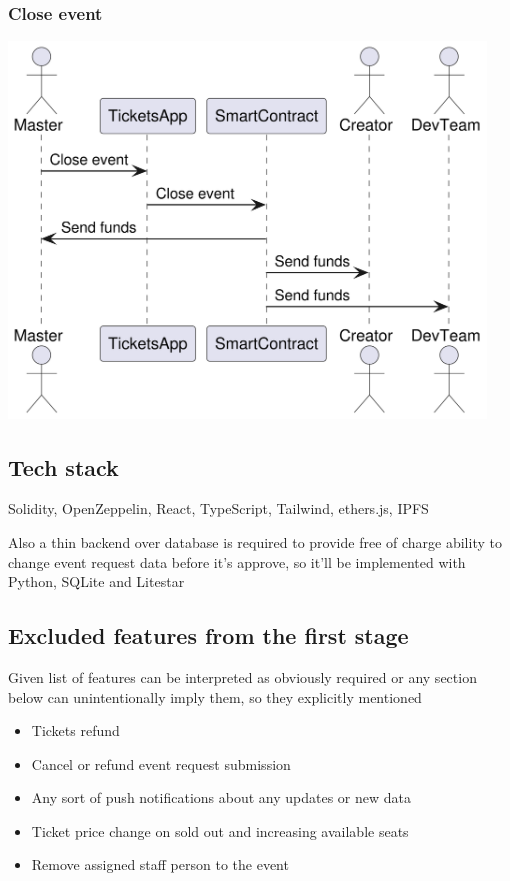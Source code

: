 \documentclass[11pt]{article}
\begin{document}
\subsubsection{Close event}
\label{sec:orgcbeb0a1}

\begin{center}
\includegraphics[width=0.95\textwidth]{./img/close-event.png}
\label{orgbb09c29}
\end{center}
\subsection{Tech stack}
\label{sec:org81f95ae}

Solidity, OpenZeppelin, React, TypeScript, Tailwind, ethers.js, IPFS

Also a thin backend over database is required to provide free of charge ability to change event request data before it's approve, so it'll be implemented with Python, SQLite and Litestar
\subsection{Excluded features from the first stage}
\label{sec:orgd0c60c9}

Given list of features can be interpreted as obviously required or any section below can unintentionally imply them, so they explicitly mentioned

\begin{itemize}
\item Tickets refund
\item Cancel or refund event request submission
\item Any sort of push notifications about any updates or new data
\item Ticket price change on sold out and increasing available seats
\item Remove assigned staff person to the event
\end{itemize}
\end{document}
